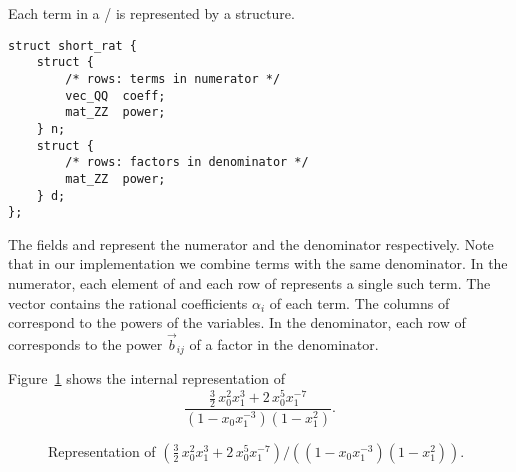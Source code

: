 Each term in a \rgf/ is represented by a 
structure.
\begin{verbatim}
struct short_rat {
    struct {
        /* rows: terms in numerator */
        vec_QQ  coeff;
        mat_ZZ  power;
    } n;
    struct {
        /* rows: factors in denominator */
        mat_ZZ  power;
    } d;
};
\end{verbatim}
The fields  and  represent the
numerator and the denominator respectively.
Note that in our implementation we combine terms
with the same denominator.
In the numerator, each element of  and each row of 
represents a single such term.
The vector  contains the rational coefficients
$\alpha_i$ of each term.
The columns of  correspond to the powers
of the variables.
In the denominator, each row of 
corresponds to the power $\vec b_{ij}$ of a 
factor in the denominator.

\begin{example}
Figure~\ref{fig:rat}
shows the internal representation of
$$
\frac{\frac 3 2 \, x_0^2 x_1^3 + 2 \, x_0^5 x_1^{-7}}
{ (1 - x_0 x_1^{-3}) (1 - x_1^2)}
.
$$

\begin{figure}
\begin{center}
\begin{minipage}{0cm}
\end{minipage}
\end{center}
\caption{Representation of
$
\left(\frac 3 2 \, x_0^2 x_1^3 + 2 \, x_0^5 x_1^{-7}\right)
/ \left( (1 - x_0 x_1^{-3}) (1 - x_1^2)\right)
$.}
\label{fig:rat}
\end{figure}

\end{example}

